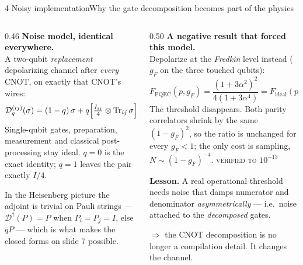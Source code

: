 \documentclass[aspectratio=169,10pt,t]{beamer}
\newcommand{\Tr}{\operatorname{Tr}}
\newcommand{\qb}{\bar{q}}
\newcommand{\acc}[1]{{\color{qitaccent}#1}}
\newcommand{\warn}[1]{{\color{qitwarn}#1}}
\newcommand{\stat}[1]{{\scriptsize\color{qitgray}\textsc{#1}}}
\begin{document}
\begin{frame}{4 \quad Noisy implementation}{Why the gate decomposition becomes part of the physics}
  \footnotesize
  \vspace{0.6ex}
  \begin{columns}[T,onlytextwidth]
  \begin{column}{0.46\textwidth}\vspace{0pt}
    \textbf{Noise model, identical everywhere.}\\[0.3ex]
    A two-qubit \emph{replacement} depolarizing channel after \emph{every}
    CNOT, on exactly that CNOT's wires:
    \[
      \mathcal{D}^{(ij)}_{q}(\sigma)=(1-q)\,\sigma
        + q\Bigl[\tfrac{I_{ij}}{4}\otimes\Tr_{ij}\sigma\Bigr],
      \quad \qb:=1-q .
    \]
    Single-qubit gates, preparation, measurement and classical
    post-processing stay ideal.\; $q=0$ is the exact identity; $q=1$ leaves
    the pair exactly $I/4$.
    \medskip

    In the Heisenberg picture the adjoint is trivial on Pauli strings ---
    $\mathcal{D}^{\dagger}(P)=P$ when $P_i=P_j=I$, else $\qb P$ --- which is
    what makes the closed forms on slide 7 possible.
  \end{column}
  \begin{column}{0.50\textwidth}\vspace{0pt}
    \textbf{A negative result that forced this model.}\\[0.3ex]
    Depolarize at the \emph{Fredkin} level instead ($g_F$ on the three
    touched qubits):
    \[
      F_{\mathrm{PQEC}}(p,g_F)=\frac{(1+3\alpha^{2})^{2}}{4(1+3\alpha^{4})}
        = F_{\mathrm{ideal}}(p),\quad \alpha^{2}=1-\varepsilon .
    \]
    \warn{The threshold disappears.}\; Both parity correlators shrink by the
    same $(1-g_F)^{2}$, so the ratio is unchanged for every $g_F<1$; the
    only cost is sampling, $N\sim(1-g_F)^{-4}$. \stat{verified to $10^{-13}$}
    \medskip

    \textbf{Lesson.}\; A real operational threshold needs noise that damps
    numerator and denominator \emph{asymmetrically} --- i.e.\ noise attached
    to the \emph{decomposed} gates.
    \smallskip

    $\Rightarrow$ the CNOT decomposition is no longer a compilation detail.
    \acc{It changes the channel.}
  \end{column}
  \end{columns}
\end{frame}
\end{document}
